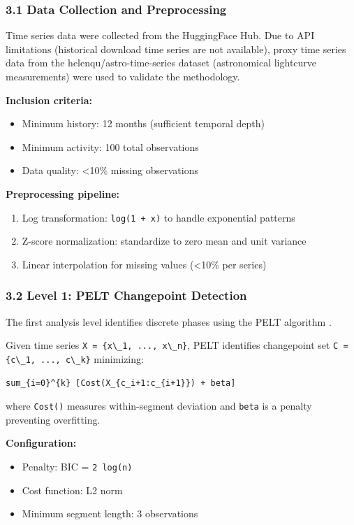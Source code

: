 
\subsubsection{3.1 Data Collection and Preprocessing}

Time series data were collected from the HuggingFace Hub. Due to API limitations (historical download time series are not available), proxy time series data from the helenqu/astro-time-series dataset (astronomical lightcurve measurements) were used to validate the methodology.

\textbf{Inclusion criteria:}
\begin{itemize}
\item Minimum history: 12 months (sufficient temporal depth)
\item Minimum activity: 100 total observations
\item Data quality: <10\% missing observations
\end{itemize}

\textbf{Preprocessing pipeline:}
\begin{enumerate}
\item Log transformation: \texttt{log(1 + x)} to handle exponential patterns
\item Z-score normalization: standardize to zero mean and unit variance
\item Linear interpolation for missing values (<10\% per series)
\end{enumerate}

\subsubsection{3.2 Level 1: PELT Changepoint Detection}

The first analysis level identifies discrete phases using the PELT algorithm \citep{Killick2012Optimal}.

Given time series \texttt{X = \{x\textbackslash \_1, ..., x\textbackslash \_n\}}, PELT identifies changepoint set \texttt{C = \{c\textbackslash \_1, ..., c\textbackslash \_k\}} minimizing:

\begin{verbatim}
sum_{i=0}^{k} [Cost(X_{c_i+1:c_{i+1}}) + beta]
\end{verbatim}

where \texttt{Cost()} measures within-segment deviation and \texttt{beta} is a penalty preventing overfitting.

\textbf{Configuration:}
\begin{itemize}
\item Penalty: BIC = \texttt{2 log(n)}
\item Cost function: L2 norm
\item Minimum segment length: 3 observations
\end{itemize}

